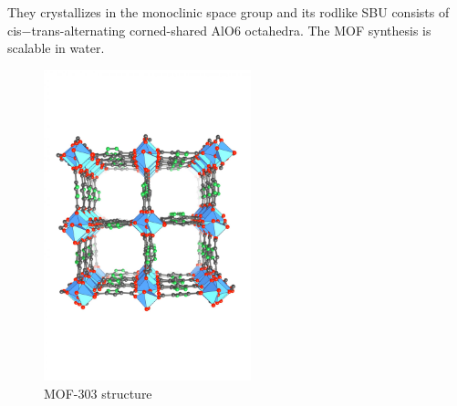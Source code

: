 \documentclass[../Master.tex]{subfiles}
\begin{document}
They crystallizes in the monoclinic space group and its rodlike SBU consists of cis−trans-alternating corned-shared AlO6 octahedra.
The MOF synthesis is scalable in water.


\begin{figure}[h!]
	\centering
	\includegraphics[width=6cm,keepaspectratio]{Images/MOF303.jpeg}
	\caption{MOF-303 structure}\label{fig:mof303structure}
\end{figure}

\end{document}
